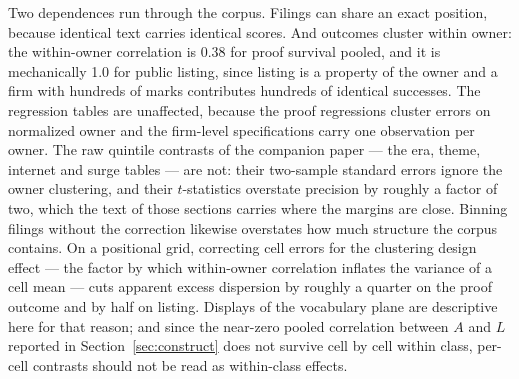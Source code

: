 Two dependences run through the corpus. Filings can share an exact
position, because identical text carries identical scores. And outcomes
cluster within owner: the within-owner correlation is 0.38 for proof
survival pooled, and it is mechanically 1.0 for public listing, since
listing is a property of the owner and a firm with hundreds of marks
contributes hundreds of identical successes. The regression tables are
unaffected, because the proof regressions cluster errors on normalized
owner and the firm-level specifications carry one observation per owner.
The raw quintile contrasts of the companion paper --- the era, theme,
internet and surge tables --- are not: their two-sample standard errors
ignore the owner clustering, and their $t$-statistics overstate
precision by roughly a factor of two, which the text of those sections
carries where the margins are close. Binning filings without the
correction likewise overstates how much structure the corpus contains.
On a positional grid, correcting cell errors for the clustering design
effect --- the factor by which within-owner correlation inflates the
variance of a cell mean --- cuts apparent excess dispersion by roughly a
quarter on the proof outcome and by half on listing. Displays of the
vocabulary plane are descriptive here for that reason; and since the
near-zero pooled correlation between $A$ and $L$ reported in
Section~\ref{sec:construct} does not survive cell by cell within class,
per-cell contrasts should not be read as within-class effects.

